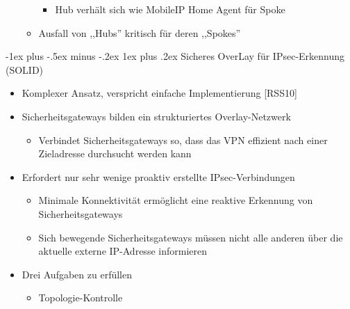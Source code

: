 \documentclass[a4paper]{article}
\makeatletter
\renewcommand{\subsubsection}{\@startsection{subsubsection}{3}{0mm}%
 {-1ex plus -.5ex minus -.2ex}%
 {1ex plus .2ex}%
 {\normalfont\small\bfseries}}
\makeatother
\begin{document}
\begin{multicols}{3}
\begin{itemize}
\begin{itemize}
                        \begin{itemize}
                            \item
                                  Hub verhält sich wie MobileIP Home Agent für Spoke
                        \end{itemize}
                  \item
                        Ausfall von ,,Hubs'' kritisch für deren ,,Spokes''
              \end{itemize}
    \end{itemize}


    \subsubsection{Sicheres OverLay für IPsec-Erkennung
        (SOLID)}

    \begin{itemize}
        \item
              Komplexer Ansatz, verspricht einfache Implementierung {[}RSS10{]}
        \item
              Sicherheitsgateways bilden ein strukturiertes Overlay-Netzwerk

              \begin{itemize}
                  \item
                        Verbindet Sicherheitsgateways so, dass das VPN effizient nach einer
                        Zieladresse durchsucht werden kann
              \end{itemize}
        \item
              Erfordert nur sehr wenige proaktiv erstellte IPsec-Verbindungen

              \begin{itemize}
                  \item
                        Minimale Konnektivität ermöglicht eine reaktive Erkennung von
                        Sicherheitsgateways
                  \item
                        Sich bewegende Sicherheitsgateways müssen nicht alle anderen über
                        die aktuelle externe IP-Adresse informieren
              \end{itemize}
        \item
              Drei Aufgaben zu erfüllen

              \begin{itemize}
                  \item
                        Topologie-Kontrolle


\end{itemize}
\end{itemize}
\end{multicols}
\end{document}
